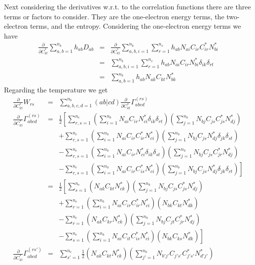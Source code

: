 \documentclass[pra]{revtex4-1}
\begin{document}
Next considering the derivatives w.r.t. to the correlation functions there are three 
terms or factors to consider. They are the one-electron energy terms, the two-electron
terms, and the entropy. Considering the one-electron energy terms we have
\begin{eqnarray}
  \frac{\partial}{\partial C^{*}_{kt}}\sum_{a,b=1}^{n_b}h_{ab}D_{ab}
  &=& \frac{\partial}{\partial C^{*}_{kt}}\sum_{a,b,i=1}^{n_b}\sum_{r=1}^{n_e}
      h_{ab}N_{ai}C_{ir}C^*_{ir}N^*_{bi} \\
  &=& \sum_{a,b,i=1}^{n_b}\sum_{r=1}^{n_e}
      h_{ab}N_{ai}C_{ir}N^*_{bi}\delta_{ik}\delta_{rt} \\
  &=& \sum_{a,b=1}^{n_b}
      h_{ab}N_{ak}C_{kt}N^*_{bk}
\end{eqnarray}
Regarding the temperature we get
\begin{eqnarray}
  \frac{\partial}{\partial C^{*}_{kt}}W_{rs}
  &=& \sum_{a,b,c,d=1}^{n_b}(ab|cd)
      \frac{\partial}{\partial C^{*}_{kt}}\Gamma_{abcd}^{(rs)} \\
  \frac{\partial}{\partial C^{*}_{kt}}\Gamma_{abcd}^{(rs)}
  &=& \frac{1}{2}\left[
      \sum_{r,s=1}^{n_e}
      \left(\sum_{i=1}^{n_b} N_{ai}C_{ir}N^*_{ci}\delta_{ik}\delta_{rt}\right)
      \left(\sum_{j=1}^{n_b} N_{bj}C_{js}C^*_{js}N^*_{dj}\right)
      \right.
      \nonumber \\
  &&+ \sum_{r,s=1}^{n_e}
      \left(\sum_{i=1}^{n_b} N_{ai}C_{ir}C^*_{ir}N^*_{ci}\right)
      \left(\sum_{j=1}^{n_b} N_{bj}C_{js}N^*_{dj}\delta_{jk}\delta_{st}\right)
      \nonumber \\
  &&- \sum_{r,s=1}^{n_e}
      \left(\sum_{i=1}^{n_b} N_{ai}C_{ir}N^*_{ci}\delta_{ik}\delta_{st}\right)
      \left(\sum_{j=1}^{n_b} N_{bj}C_{js}C^*_{jr}N^*_{dj}\right)
      \nonumber \\
  &&- \left.
      \sum_{r,s=1}^{n_e}
      \left(\sum_{i=1}^{n_b} N_{ai}C_{ir}C^*_{is}N^*_{ci}\right)
      \left(\sum_{j=1}^{n_b} N_{bj}C_{js}N^*_{dj}\delta_{jk}\delta_{rt}\right)
      \right] \\
  &=& \frac{1}{2}\left[
      \sum_{s=1}^{n_e}
      \left(                 N_{ak}C_{kt}N^*_{ck}\right)
      \left(\sum_{j=1}^{n_b} N_{bj}C_{js}C^*_{js}N^*_{dj}\right)
      \right.
      \nonumber \\
  &&+ \sum_{r=1}^{n_e}
      \left(\sum_{i=1}^{n_b} N_{ai}C_{ir}C^*_{ir}N^*_{ci}\right)
      \left(                 N_{bk}C_{kt}N^*_{dk}\right)
      \nonumber \\
  &&- \sum_{r=1}^{n_e}
      \left(                 N_{ak}C_{kr}N^*_{ck}\right)
      \left(\sum_{j=1}^{n_b} N_{bj}C_{jt}C^*_{jr}N^*_{dj}\right)
      \nonumber \\
  &&- \left.
      \sum_{s=1}^{n_e}
      \left(\sum_{i=1}^{n_b} N_{ai}C_{it}C^*_{is}N^*_{ci}\right)
      \left(                 N_{bk}C_{ks}N^*_{dk}\right)
      \right]
      \label{Eq:2densmat_aa_dC}
  \\
  \frac{\partial}{\partial C^{*}_{kt}}\Gamma_{abcd}^{(rs')}
  &=& \sum_{s'=1}^{n_e}\frac{1}{2}
      \left(                  N_{ak}C_{kt}N^*_{ck}\right)
      \left(\sum_{j'=1}^{n_b} N_{b'j'}C_{j's'}C^*_{j's'}N^*_{d'j'}\right)
      \label{Eq:2densmat_ab_dC}
\end{eqnarray}
\end{document}
